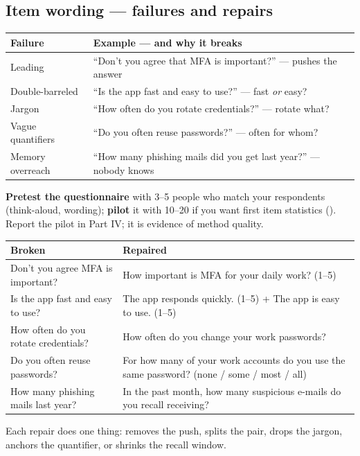 \documentclass[11pt,a4paper,british,twoside=false,headings=small,chapterprefix=false,numbers=noenddot]{scrbook}
\newenvironment{alertblock}[1]{\begin{tcolorbox}[scriptbox, colframe=uiared, colback=uiamutedred, title={#1}]}{\end{tcolorbox}}
\begin{document}
\subsection{Item wording --- failures and repairs}
\begin{center}\small
\small
  \renewcommand{\arraystretch}{1.35}
  \begin{tabular}{@{}p{3.2cm}p{10.0cm}@{}}
    \toprule
    \textbf{Failure} & \textbf{Example --- and why it breaks}\\
    \midrule
    Leading & ``Don't you agree that MFA is important?'' --- pushes the answer\\
    Double-barreled & ``Is the app fast and easy to use?'' --- fast \emph{or} easy?\\
    Jargon & ``How often do you rotate credentials?'' --- rotate what?\\
    Vague quantifiers & ``Do you often reuse passwords?'' --- often for whom?\\
    Memory overreach & ``How many phishing mails did you get last year?'' --- nobody knows\\
    \bottomrule
  \end{tabular}
  

  \begin{alertblock}{The one defence that catches all five}
    \textbf{Pretest the questionnaire} with 3--5 people who match your
    respondents (think-aloud, wording); \textbf{pilot} it with 10--20 if you
    want first item statistics (). Report the
    pilot in Part IV; it is evidence of method quality.
  \end{alertblock}
\end{center}

\begin{center}\small
\footnotesize
  \renewcommand{\arraystretch}{1.35}
  \begin{tabular}{@{}p{6.4cm}p{6.6cm}@{}}
    \toprule
    \textbf{Broken} & \textbf{Repaired}\\
    \midrule
    Don't you agree MFA is important? & How important is MFA for your daily work? (1--5)\\
    Is the app fast and easy to use? & The app responds quickly. (1--5) \; + \; The app is easy to use. (1--5)\\
    How often do you rotate credentials? & How often do you change your work passwords?\\
    Do you often reuse passwords? & For how many of your work accounts do you use the same password? (none / some / most / all)\\
    How many phishing mails last year? & In the past month, how many suspicious e-mails do you recall receiving?\\
    \bottomrule
  \end{tabular}
  

  Each repair does one thing: removes the push, splits the pair, drops the
  jargon, anchors the quantifier, or shrinks the recall window.
\end{center}
\end{document}
